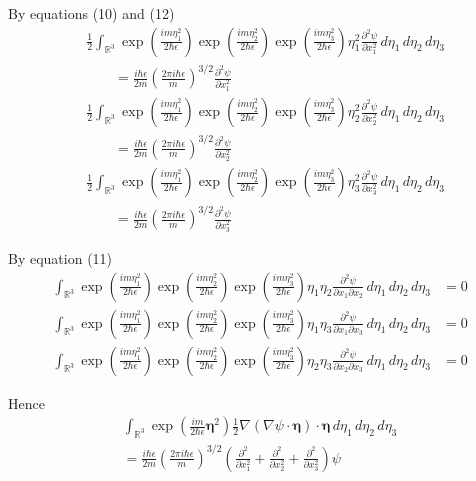 \documentclass[12pt]{article}
\begin{document}
By equations (10) and (12)
\begin{align*}
&\frac{1}{2}\int_{\mathbb R^3}
\exp\left(\frac{im\eta_1^2}{2\hbar\epsilon}\right)
\exp\left(\frac{im\eta_2^2}{2\hbar\epsilon}\right)
\exp\left(\frac{im\eta_3^2}{2\hbar\epsilon}\right)
\eta_1^2\frac{\partial^2\psi}{\partial x_1^2}
\,d\eta_1\,d\eta_2\,d\eta_3
\\
&\qquad{}=\frac{i\hbar\epsilon}{2m}\left(\frac{2\pi i\hbar\epsilon}{m}\right)^{3/2}
\frac{\partial^2\psi}{\partial x_1^2}
\\
&\frac{1}{2}\int_{\mathbb R^3}
\exp\left(\frac{im\eta_1^2}{2\hbar\epsilon}\right)
\exp\left(\frac{im\eta_2^2}{2\hbar\epsilon}\right)
\exp\left(\frac{im\eta_3^2}{2\hbar\epsilon}\right)
\eta_2^2\frac{\partial^2\psi}{\partial x_2^2}
\,d\eta_1\,d\eta_2\,d\eta_3
\\
&\qquad{}=\frac{i\hbar\epsilon}{2m}\left(\frac{2\pi i\hbar\epsilon}{m}\right)^{3/2}
\frac{\partial^2\psi}{\partial x_2^2}
\\
&\frac{1}{2}\int_{\mathbb R^3}
\exp\left(\frac{im\eta_1^2}{2\hbar\epsilon}\right)
\exp\left(\frac{im\eta_2^2}{2\hbar\epsilon}\right)
\exp\left(\frac{im\eta_3^2}{2\hbar\epsilon}\right)
\eta_3^2\frac{\partial^2\psi}{\partial x_3^2}
\,d\eta_1\,d\eta_2\,d\eta_3
\\
&\qquad{}=\frac{i\hbar\epsilon}{2m}\left(\frac{2\pi i\hbar\epsilon}{m}\right)^{3/2}
\frac{\partial^2\psi}{\partial x_3^2}
\end{align*}

By equation (11)
\begin{align*}
\int_{\mathbb R^3}
\exp\left(\frac{im\eta_1^2}{2\hbar\epsilon}\right)
\exp\left(\frac{im\eta_2^2}{2\hbar\epsilon}\right)
\exp\left(\frac{im\eta_3^2}{2\hbar\epsilon}\right)
\eta_1\eta_2\frac{\partial^2\psi}{\partial x_1\partial x_2}
\,d\eta_1\,d\eta_2\,d\eta_3
&=0
\\
\int_{\mathbb R^3}
\exp\left(\frac{im\eta_1^2}{2\hbar\epsilon}\right)
\exp\left(\frac{im\eta_2^2}{2\hbar\epsilon}\right)
\exp\left(\frac{im\eta_3^2}{2\hbar\epsilon}\right)
\eta_1\eta_3\frac{\partial^2\psi}{\partial x_1\partial x_3}
\,d\eta_1\,d\eta_2\,d\eta_3
&=0
\\
\int_{\mathbb R^3}
\exp\left(\frac{im\eta_1^2}{2\hbar\epsilon}\right)
\exp\left(\frac{im\eta_2^2}{2\hbar\epsilon}\right)
\exp\left(\frac{im\eta_3^2}{2\hbar\epsilon}\right)
\eta_2\eta_3\frac{\partial^2\psi}{\partial x_2\partial x_3}
\,d\eta_1\,d\eta_2\,d\eta_3
&=0
\end{align*}

Hence
\begin{multline*}
\int_{\mathbb R^3}
\exp\left(\frac{im}{2\hbar\epsilon}\boldsymbol\eta^2\right)
\tfrac{1}{2}
\nabla(\nabla\psi\cdot\boldsymbol\eta)\cdot\boldsymbol\eta
\,d\eta_1\,d\eta_2\,d\eta_3
\\
{}=\frac{i\hbar\epsilon}{2m}\left(\frac{2\pi i\hbar\epsilon}{m}\right)^{3/2}
\left(
\frac{\partial^2}{\partial x_1^2}+
\frac{\partial^2}{\partial x_2^2}+
\frac{\partial^2}{\partial x_3^2}
\right)\psi
\tag{15}
\end{multline*}
\end{document}
